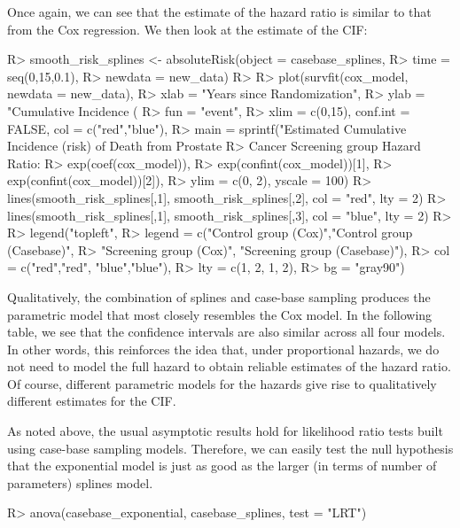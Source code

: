 \documentclass[
]{jss}
\begin{document}
Once again, we can see that the estimate of the hazard ratio is similar
to that from the Cox regression. We then look at the estimate of the
CIF:

\begin{CodeChunk}

\begin{CodeInput}
R> smooth_risk_splines <- absoluteRisk(object = casebase_splines, 
R>                                     time = seq(0,15,0.1), 
R>                                     newdata = new_data)
R> 
R> plot(survfit(cox_model, newdata = new_data),
R>      xlab = "Years since Randomization", 
R>      ylab = "Cumulative Incidence (%
R>      fun = "event",
R>      xlim = c(0,15), conf.int = FALSE, col = c("red","blue"), 
R>      main = sprintf("Estimated Cumulative Incidence (risk) of Death from Prostate 
R>                     Cancer Screening group Hazard Ratio: %
R>                     exp(coef(cox_model)), 
R>                     exp(confint(cox_model))[1], 
R>                     exp(confint(cox_model))[2]),
R>      ylim = c(0, 2), yscale = 100)
R> lines(smooth_risk_splines[,1], smooth_risk_splines[,2], col = "red", lty = 2)
R> lines(smooth_risk_splines[,1], smooth_risk_splines[,3], col = "blue", lty = 2)
R> 
R> legend("topleft", 
R>        legend = c("Control group (Cox)","Control group (Casebase)",
R>                   "Screening group (Cox)", "Screening group (Casebase)"), 
R>        col = c("red","red", "blue","blue"),
R>        lty = c(1, 2, 1, 2), 
R>        bg = "gray90")
\end{CodeInput}
\end{CodeChunk}

Qualitatively, the combination of splines and case-base sampling
produces the parametric model that most closely resembles the Cox model.
In the following table, we see that the confidence intervals are also
similar across all four models. In other words, this reinforces the idea
that, under proportional hazards, we do not need to model the full
hazard to obtain reliable estimates of the hazard ratio. Of course,
different parametric models for the hazards give rise to qualitatively
different estimates for the CIF.

As noted above, the usual asymptotic results hold for likelihood ratio
tests built using case-base sampling models. Therefore, we can easily
test the null hypothesis that the exponential model is just as good as
the larger (in terms of number of parameters) splines model.

\begin{CodeChunk}

\begin{CodeInput}
R> anova(casebase_exponential, casebase_splines, test = "LRT")
\end{CodeInput}
\end{CodeChunk}
\end{document}
